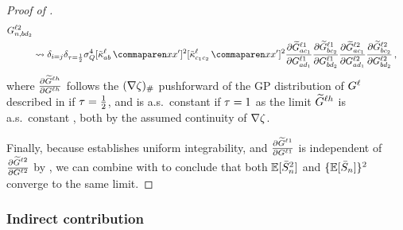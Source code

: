 \begin{proof}[Proof of ]
\begin{align}
{            \logitSymbol_{\sequenceVariable, \fIndexB d_2}^{\depthSymbol 2}
        }
        \nonumber
        \\
        &\convergeDist
        \delta_{i = j}
        \delta_{\scaling = \frac{1}{2}}
        \queryStd^4
        [\kerntildef{a b}{\depthSymbol}{\inputSymbol}{\inputSymbol'}]^2
        [\kerntildef{c_1 c_2}{\depthSymbol}{\inputSymbol}{\inputSymbol'}]^2
        \frac{
            \partial
            \tildeLogit{\fIndexA c_1}{\depthSymbol 1}
        }{
            \partial
            \logitSymbol_{\fIndexA d_1}^{\depthSymbol 1}
        }
        \frac{
            \partial
            \tildeLogit{\fIndexB c_2}{\depthSymbol 1}
        }{
            \partial
            \logitSymbol_{\fIndexB d_2}^{\depthSymbol 1}
        }
        \frac{
            \partial
            \tildeLogit{\fIndexA c_1}{\depthSymbol 2}
        }{
            \partial
            \logitSymbol_{\fIndexA d_1}^{\depthSymbol 2}
        }
        \frac{
            \partial
            \tildeLogit{\fIndexB c_2}{\depthSymbol 2}
        }{
            \partial
            \logitSymbol_{\fIndexB d_2}^{\depthSymbol 2}
        }
        \, ,
    \end{align}
    where $\frac{\partial \widetilde{G}_{}^{\ell h}}{\partial G^{\ell h}}$
    follows the $(\nabla \zeta)_{\#}$ pushforward of the GP distribution of $G^{\ell}$ described in  if $\tau = \frac{1}{2}$, and is a.s.\ constant if $\tau = 1$ as the limit $\widetilde{G}_{}^{\ell h}$ is a.s.\ constant \citep[appendix A]{yang2019v2}, both by the assumed continuity of $\nabla \zeta$.
    
    Finally, because  establishes uniform integrability, and $\frac{\partial \widetilde{G}_{}^{\ell 1}}{\partial G^{\ell 1}}$ is independent of $\frac{\partial \widetilde{G}_{}^{\ell 2}}{\partial G^{\ell 2}}$ by , we can combine  with  to conclude that both $\operatorname*{\mathbb{E}} [ \bar{S}_{n}^2 ]$ and $\{ \operatorname*{\mathbb{E}} [ \bar{S}_{n} ] \}^2$ converge to the same limit.
\end{proof}



\subsubsection{Indirect contribution}

